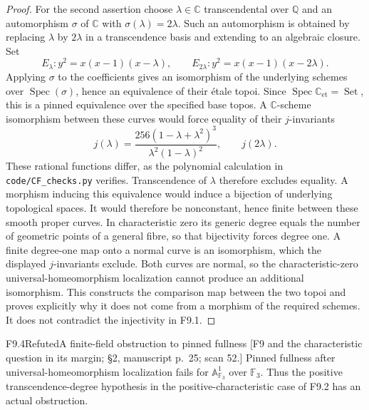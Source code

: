 \begin{proof}
For the second assertion choose $\lambda\in\mathbb C$ transcendental
over $\mathbb Q$ and an automorphism $\sigma$ of $\mathbb C$ with
$\sigma(\lambda)=2\lambda$. Such an automorphism is obtained by
replacing $\lambda$ by $2\lambda$ in a transcendence basis and
extending to an algebraic closure. Set
\[
 E_\lambda:y^2=x(x-1)(x-\lambda),\qquad
 E_{2\lambda}:y^2=x(x-1)(x-2\lambda).
\]
Applying $\sigma$ to the coefficients gives an isomorphism of the
underlying schemes over $\operatorname{Spec}(\sigma)$, hence an
equivalence of their \'etale topoi. Since
$\operatorname{Spec}\mathbb C_{\mathrm{et}}=\operatorname{Set}$,
this is a pinned equivalence over the specified base topos. A
$\mathbb C$-scheme isomorphism between these curves would force equality
of their $j$-invariants
\[
 j(\lambda)=\frac{256(1-\lambda+\lambda^2)^3}
 {\lambda^2(1-\lambda)^2},\qquad j(2\lambda).
\]
These rational functions differ, as the polynomial calculation in
\texttt{code/CF\_checks.py} verifies. Transcendence of $\lambda$
therefore excludes equality. A morphism inducing this equivalence
would induce a bijection of underlying topological spaces. It would
therefore be nonconstant, hence finite between these smooth proper
curves. In characteristic zero its generic degree equals the number
of geometric points of a general fibre, so that bijectivity forces
degree one. A finite degree-one map onto a normal curve is an
isomorphism, which the displayed $j$-invariants exclude.
Both curves are normal, so the
characteristic-zero universal-homeomorphism localization cannot
produce an additional isomorphism. This constructs the comparison
map between the two topoi and proves explicitly why it does not come
from a morphism of the required schemes. It does not contradict the
injectivity in F9.1.
\end{proof}

\begin{result}{F9.4}{Refuted}{A finite-field obstruction to pinned fullness}
\textup{[F9 and the characteristic question in its margin; \S2,
manuscript p.\ 25; scan 52.]}
Pinned fullness after universal-homeomorphism localization fails for
$\mathbb A^1_{\mathbb F_3}$ over $\mathbb F_3$. Thus the positive
transcendence-degree hypothesis in the positive-characteristic case
of F9.2 has an actual obstruction.
\end{result}

